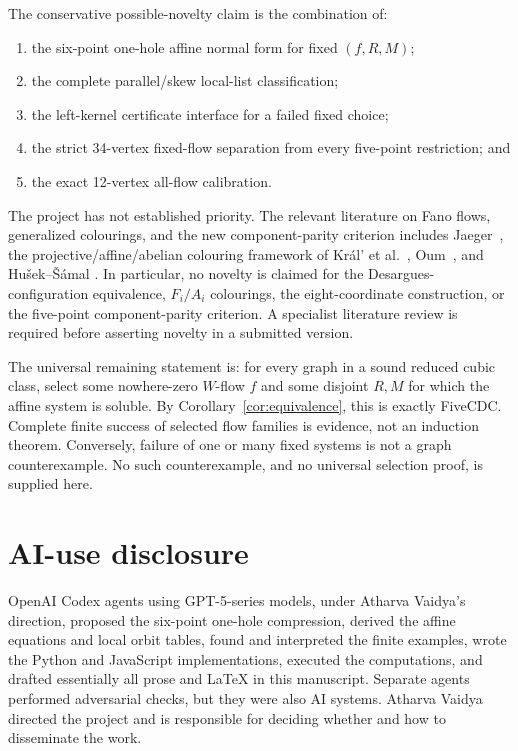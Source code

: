 \documentclass[11pt]{article}
\theoremstyle{definition}
\theoremstyle{remark}
\newcommand{\FiveCDC}{\textup{FiveCDC}}
\numberwithin{equation}{section}
\begin{document}
The conservative possible-novelty claim is the combination of:
\begin{enumerate}
\item the six-point one-hole affine normal form for fixed
      \((f,R,M)\);
\item the complete parallel/skew local-list classification;
\item the left-kernel certificate interface for a failed fixed choice;
\item the strict 34-vertex fixed-flow separation from every five-point
      restriction; and
\item the exact 12-vertex all-flow calibration.
\end{enumerate}
The project has not established priority.  The relevant literature on
Fano flows, generalized colourings, and the new component-parity
criterion includes Jaeger~\cite{Jaeger1979}, the projective/affine/abelian
colouring framework of Kr\'al' et al.~\cite{KralEtAl2009},
Oum~\cite{Oum2026}, and Hu\v{s}ek--\v{S}\'amal
\cite{HusekSamal2026}.  In particular, no novelty is claimed for the
Desargues-configuration equivalence, \(F_i/A_i\) colourings, the
eight-coordinate construction, or the five-point component-parity
criterion.  A specialist literature review is required before asserting
novelty in a submitted version.

The universal remaining statement is: for every graph in a sound
reduced cubic class, select some nowhere-zero \(W\)-flow \(f\) and some
disjoint \(R,M\) for which the affine system is soluble.  By
Corollary~\ref{cor:equivalence}, this is exactly \FiveCDC.  Complete
finite success of selected flow families is evidence, not an induction
theorem.  Conversely, failure of one or many fixed systems is not a graph
counterexample.  No such counterexample, and no universal selection
proof, is supplied here.

\section*{AI-use disclosure}

OpenAI Codex agents using GPT-5-series models, under Atharva Vaidya's
direction, proposed the six-point one-hole compression, derived the
affine equations and local orbit tables, found and interpreted the finite
examples, wrote the Python and JavaScript implementations, executed the
computations, and drafted essentially all prose and \LaTeX{} in this
manuscript.  Separate agents performed adversarial checks, but they were
also AI systems.  Atharva Vaidya directed the project and is responsible
for deciding whether and how to disseminate the work.
\end{document}
